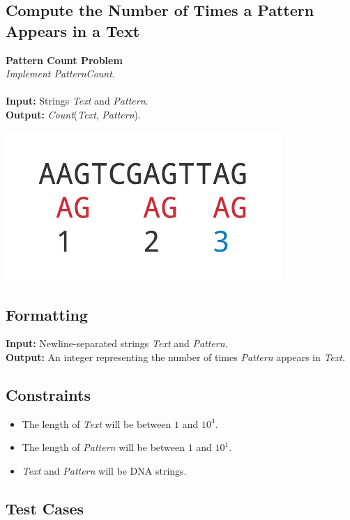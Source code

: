 \documentclass{article}
\begin{document}
\subsection{Compute the Number of Times a Pattern Appears in a Text}
\hline\vspace{5}
\noindent \textbf{Pattern Count Problem}\\
\emph{Implement PatternCount}.\\ \\
\textbf{Input:} Strings \emph{Text} and \emph{Pattern}.\\
\textbf{Output:} \emph{Count}(\emph{Text}, \emph{Pattern}).
\begin{center}
    \includegraphics[scale=0.32]{c1/logos/1A.png} 
\end{center}
\hline\vspace{5}

\subsection*{Formatting}
\textbf{Input:} Newline-separated strings \emph{Text} and \emph{Pattern}.\\
\noindent \textbf{Output:} An integer representing the number of times \emph{Pattern} appears in \emph{Text}.

\subsection*{Constraints}
\begin{itemize}
    \item The length of \emph{Text} will be between $1$ and $10^4$.
    \item The length of \emph{Pattern} will be between $1$ and $10^1$.
    \item \emph{Text} and \emph{Pattern} will be DNA strings.
\end{itemize}
\pagebreak

\subsection*{Test Cases}
\end{document}
